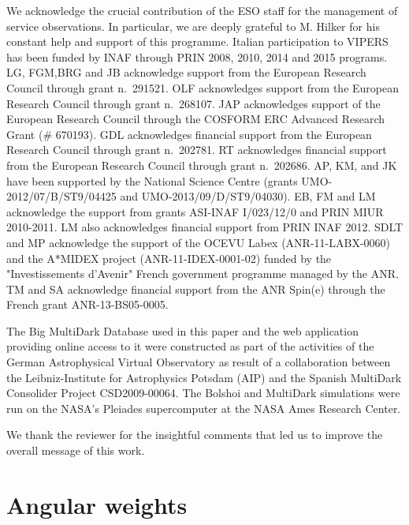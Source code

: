 \documentclass[longauth]{aa}
\begin{document}
\begin{acknowledgements}

We acknowledge the crucial contribution of the ESO staff for the
management of service observations. In particular, we are deeply
grateful to M. Hilker for his constant help and support of this
programme. Italian participation to VIPERS has been funded by INAF
through PRIN 2008, 2010, 2014 and 2015 programs. LG, FGM,BRG and JB
acknowledge support from the European Research Council through grant
n.~291521. OLF acknowledges support from the European Research Council
through grant n.~268107. JAP acknowledges support of the European
Research Council through the COSFORM ERC Advanced Research Grant (\#
670193). GDL acknowledges financial support from the European Research
Council through grant n.~202781. RT acknowledges financial support
from the European Research Council through grant n.~202686. AP, KM,
and JK have been supported by the National Science Centre (grants
UMO-2012/07/B/ST9/04425 and UMO-2013/09/D/ST9/04030). EB, FM and LM
acknowledge the support from grants ASI-INAF I/023/12/0 and PRIN MIUR
2010-2011. LM also acknowledges financial support from PRIN INAF
2012. SDLT and MP acknowledge the support of the OCEVU Labex
(ANR-11-LABX-0060) and the A*MIDEX project (ANR-11-IDEX-0001-02)
funded by the "Investissements d'Avenir" French government programme
managed by the ANR. TM and SA acknowledge financial
support from the ANR Spin(e) through the French grant
ANR-13-BS05-0005.

The Big MultiDark Database used in this paper and the web application providing online access to it were constructed as part of the activities of the German Astrophysical Virtual Observatory as result of a collaboration between the Leibniz-Institute for Astrophysics Potsdam (AIP) and the Spanish MultiDark Consolider Project CSD2009-00064. The Bolshoi and MultiDark simulations were run on the NASA's Pleiades supercomputer at the NASA Ames Research Center.

We thank the reviewer for the insightful comments that led us to improve the overall message of this work.

\end{acknowledgements}




\appendix

\section{Angular weights}\label{ap:weights}
\end{document}
